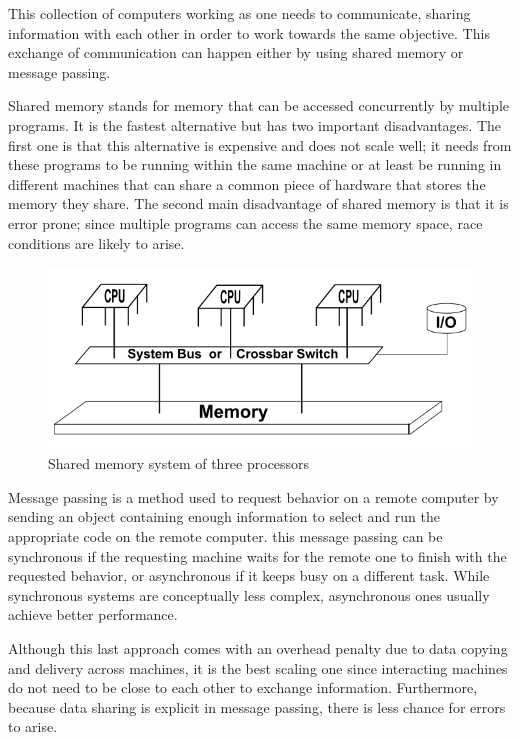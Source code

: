 This collection of computers working as one needs to communicate, sharing information with each other in order to work towards the same objective. This exchange of communication can happen either by using shared memory or message passing.

Shared memory stands for memory that can be accessed concurrently by multiple programs. It is the fastest alternative but has two important disadvantages. The first one is that this alternative is expensive and does not scale well; it needs from these programs to be running within the same machine or at least be running in different machines that can share a common piece of hardware that stores the memory they share. The second main disadvantage of shared memory is that it is error prone; since multiple programs can access the same memory space, race conditions are likely to arise.

\begin{figure}[h!]
\centering
    \includegraphics[scale=0.6]{assets/images/Shared_memory.png}
    \caption{Shared memory system of three processors}
    \label{fig:shared_memory}
\end{figure}

\newpage
Message passing is a method used to request behavior on a remote computer by sending an object containing enough information to select and run the appropriate code on the remote computer. this message passing can be synchronous if the requesting machine waits for the remote one to finish with the requested behavior, or asynchronous if it keeps busy on a different task. While synchronous systems are conceptually less complex, asynchronous ones usually achieve better performance.

Although this last approach comes with an overhead penalty due to data copying and delivery across machines, it is the best scaling one since interacting machines do not need to be close to each other to exchange information. Furthermore, because data sharing is explicit in message passing, there is less chance for errors to arise. 

